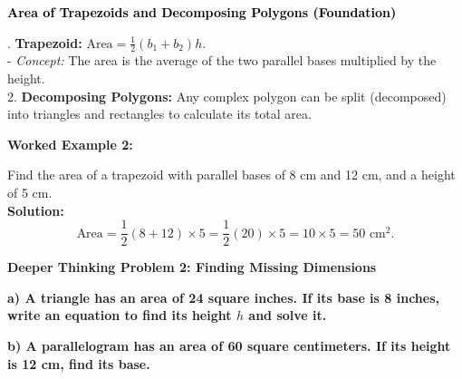 \documentclass[12pt, letterpaper, fleqn]{article}
\begin{document}
\begin{tcolorbox}[colback=black!10]
    \large\textcolor{black}{\textbf{Area of Trapezoids and Decomposing Polygons (Foundation)}}
\end{tcolorbox}

\vspace{3mm}

. \textbf{Trapezoid:} $\text{Area} = \frac{1}{2}(b_1 + b_2)h$. \\
- \textit{Concept:} The area is the average of the two parallel bases multiplied by the height. \\
2. \textbf{Decomposing Polygons:} Any complex polygon can be split (decomposed) into triangles and rectangles to calculate its total area.

\vspace{4mm}

\begin{tcolorbox}[colback=white, colframe=black!25, boxrule=0.6pt, arc=4mm, left=6mm, right=6mm, top=5mm, bottom=5mm]
\textbf{Worked Example 2:}

\medskip
\noindent
Find the area of a trapezoid with parallel bases of 8 cm and 12 cm, and a height of 5 cm.\\
\textbf{Solution:} \\
$$\text{Area} = \frac{1}{2}(8 + 12) \times 5 = \frac{1}{2}(20) \times 5 = 10 \times 5 = 50\text{ cm}^2.$$
\end{tcolorbox}

\vspace{4mm}

\begin{tcolorbox}[colback=black!5, colframe=black!50, boxrule=1pt, arc=4mm, left=6mm, right=6mm, top=5mm, bottom=5mm]
\textbf{Deeper Thinking Problem 2: Finding Missing Dimensions}

\medskip

\noindent
\textbf{a) A triangle has an area of 24 square inches. If its base is 8 inches, write an equation to find its height $h$ and solve it.}

\vspace{2.5cm}

\noindent
\textbf{b) A parallelogram has an area of 60 square centimeters. If its height is 12 cm, find its base.}

\vspace{2cm}
\end{tcolorbox}
\newpage
\end{document}
